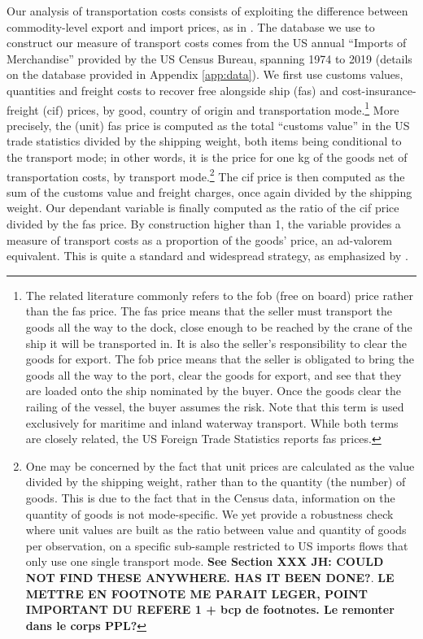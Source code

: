 \documentclass[a4paper,11pt]{article}
\begin{document}
Our analysis of transportation costs consists of exploiting the difference between commodity-level export and import prices, as in \cite{hummels2007}. The database we use to construct our measure of transport costs comes from the US annual ``Imports of Merchandise'' provided by the US Census Bureau, spanning 1974 to 2019 (details on the database provided in Appendix \ref{app:data}). We first use customs values, quantities and freight costs to recover free alongside ship (fas) and cost-insurance-freight (cif) prices, by good, country of origin and transportation mode.\footnote{The related literature commonly refers to the fob (free on board) price rather than the fas price. The fas price means that the seller must transport the goods all the way to the dock, close enough to be reached by the crane of the ship it will be transported in. It is also the seller's responsibility to clear the goods for export. The fob price means that the seller is obligated to bring the goods all the way to the port, clear the goods for export, and see that they are loaded onto the ship nominated by the buyer. Once the goods clear the railing of the vessel, the buyer assumes the risk. Note that this term is used exclusively for maritime and inland waterway transport. While both terms are closely related, the US Foreign Trade Statistics reports fas prices.} More precisely, the (unit) fas price is computed as the total ``customs value'' in the US trade statistics divided by the shipping weight, both items being conditional to the transport mode; in other words, it is the price for one kg of the goods net of transportation costs, by transport mode.\footnote{One may be concerned by the fact that unit prices are calculated as the value divided by the shipping weight, rather than to the quantity (the number) of goods. This is due to the fact that in the Census data, information on the quantity of goods is not mode-specific. We yet provide a robustness check where unit values are built as the ratio between value and quantity of goods per observation, on a specific sub-sample restricted to US imports flows that only use one single transport mode. \textbf{See Section XXX JH: COULD NOT FIND THESE ANYWHERE. HAS IT BEEN DONE?}. \textbf{LE METTRE EN FOOTNOTE ME PARAIT LEGER, POINT IMPORTANT DU REFERE 1 + bcp de footnotes. Le remonter dans le corps PPL?}} The cif price is then computed as the sum of the customs value and freight charges, once again divided by the shipping weight. Our dependant variable is finally computed as the ratio of the cif price divided by the fas price. By construction higher than 1, the variable provides a measure of transport costs as a proportion of the goods' price, an ad-valorem equivalent. This is quite a standard and widespread strategy, as emphasized by \cite{anderson_wincoop_jel}.
\end{document}
